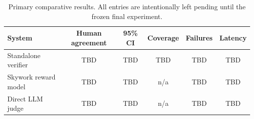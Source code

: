 \begin{table}[htbp]
\centering
\footnotesize
\caption{Primary comparative results. All entries are intentionally left pending until the frozen final experiment.}
\label{tab:primary-results}
\begin{tabular}{lccccc}
\toprule
\textbf{System} & \textbf{Human agreement} & \textbf{95\% CI} & \textbf{Coverage} & \textbf{Failures} & \textbf{Latency} \\
\midrule
Standalone verifier & TBD & TBD & TBD & TBD & TBD \\
Skywork reward model & TBD & TBD & n/a & TBD & TBD \\
Direct LLM judge & TBD & TBD & n/a & TBD & TBD \\
\bottomrule
\end{tabular}
\end{table}
